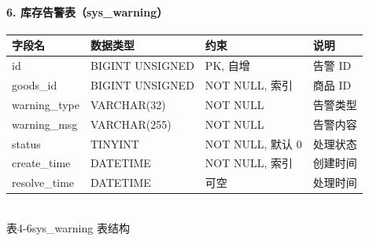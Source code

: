 \paragraph{6. 库存告警表（sys\_warning）}
\begin{center}
  \renewcommand{\arraystretch}{1.4}
  \begin{tabular}{|>{\centering\arraybackslash}m{2.5cm}|>{\centering\arraybackslash}m{3.2cm}|>{\centering\arraybackslash}m{4.4cm}|>{\centering\arraybackslash}m{3.5cm}|}
    \hline
    \textbf{字段名}  & \textbf{数据类型}   & \textbf{约束}    & \textbf{说明} \\ \hline
    id            & BIGINT UNSIGNED & PK, 自增         & 告警 ID       \\ \hline
    goods\_id     & BIGINT UNSIGNED & NOT NULL, 索引   & 商品 ID       \\ \hline
    warning\_type & VARCHAR(32)     & NOT NULL       & 告警类型        \\ \hline
    warning\_msg  & VARCHAR(255)    & NOT NULL       & 告警内容        \\ \hline
    status        & TINYINT         & NOT NULL, 默认 0 & 处理状态        \\ \hline
    create\_time  & DATETIME        & NOT NULL, 索引   & 创建时间        \\ \hline
    resolve\_time & DATETIME        & 可空             & 处理时间        \\ \hline
  \end{tabular}
  \\[0.3em]
  {表4-6\quad sys\_warning 表结构}
\end{center}


